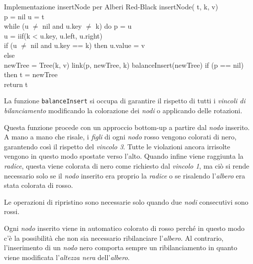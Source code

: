 \begin{minicode}{Implementazione insertNode per Alberi Red-Black}
\ind{} insertNode( t,  k,  v)\\
     p = nil\hfill{}
     u = t\\
    \indf while (u $\neq$ nil and u.key $\neq$ k) do\hfill{}
        p = u\\
        u = iif(k < u.key, u.left, u.right)\\
    \indf if (u $\neq$ nil and u.key == k) then\hfill{}
        u.value = v\\
    \indf else\\
         newTree = Tree(k, v)\hfill{}
        link(p, newTree, k)\hfill{}
        balanceInsert(newTree)\hfill{}
        \indff if (p == nil) then\hfill{}
            t = newTree\\
    \indf return t
\end{minicode}\noindent
La funzione \texttt{balanceInsert} si occupa di garantire il rispetto di tutti i
\emph{vincoli di bilanciamento} modificando la colorazione dei \emph{nodi} o
applicando delle rotazioni.

Questa funzione procede con un approccio bottom-up a partire dal \emph{nodo}
inserito. A mano a mano che risale, i \emph{figli} di ogni \emph{nodo} rosso
vengono colorati di nero, garantendo così il rispetto del \emph{vincolo 3}.
Tutte le violazioni ancora irrisolte vengono in questo modo spostate verso
l'alto. Quando infine viene raggiunta la \emph{radice}, questa viene colorata
di nero come richiesto dal \emph{vincolo 1}, ma ciò si rende necessario solo se
il \emph{nodo} inserito era proprio la \emph{radice} o se risalendo
l'\emph{albero} era stata colorata di rosso.

\begin{note}
    Le operazioni di ripristino sono necessarie solo quando due \emph{nodi}
    consecutivi sono rossi.
\end{note}
\begin{note}
    Ogni \emph{nodo} inserito viene in automatico colorato di rosso perché in
    questo modo c'è la possibilità che non sia necessario ribilanciare
    l'\emph{albero}. Al contrario, l'inserimento di un \emph{nodo} nero
    comporta sempre un ribilanciamento in quanto viene modificata
    l'\emph{altezza nera} dell'\emph{albero}.
\end{note}

